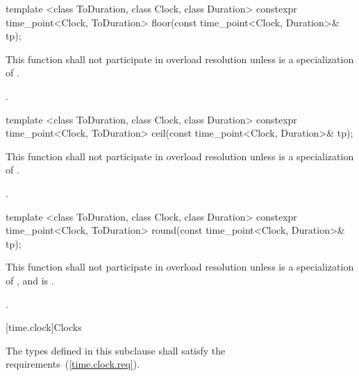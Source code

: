%
\begin{itemdecl}
template <class ToDuration, class Clock, class Duration>
  constexpr time_point<Clock, ToDuration>
  floor(const time_point<Clock, Duration>& tp);
\end{itemdecl}

\begin{itemdescr}
\pnum
\remarks This function shall not participate in overload resolution
unless  is a specialization of .

\pnum
\returns {}.
\end{itemdescr}

%
\begin{itemdecl}
template <class ToDuration, class Clock, class Duration>
  constexpr time_point<Clock, ToDuration>
  ceil(const time_point<Clock, Duration>& tp);
\end{itemdecl}

\begin{itemdescr}
\pnum
\remarks This function shall not participate in overload resolution
unless  is a specialization of .

\pnum
\returns {}.
\end{itemdescr}

%
\begin{itemdecl}
template <class ToDuration, class Clock, class Duration>
  constexpr time_point<Clock, ToDuration>
  round(const time_point<Clock, Duration>& tp);
\end{itemdecl}

\begin{itemdescr}
\pnum
\remarks This function shall not participate in overload resolution
unless  is a specialization of , and
 is .

\pnum
\returns {}.
\end{itemdescr}

[time.clock]{Clocks}

\pnum
The types defined in this subclause shall satisfy the
requirements~(\ref{time.clock.req}).


